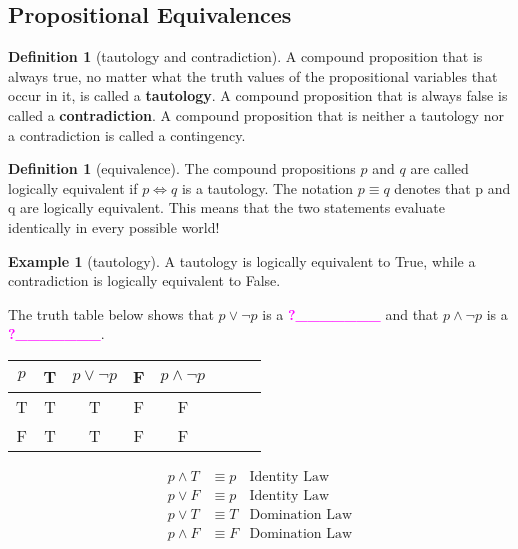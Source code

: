 \documentclass[letterpaper,10pt]{article}
\theoremstyle{plain}
\theoremstyle{definition}
\newtheorem{defn}[thm]{Definition}
\newtheorem{exmp}[thm]{Example}
\theoremstyle{remark}
\providecommand{\land}{\ensuremath{\wedge}}
\providecommand{\lor}{\ensuremath{\vee}}
\providecommand{\todo}[1]{\textcolor{magenta}{\textbf{#1}}}
\begin{document}
\subsection{Propositional Equivalences}

\begin{defn}[tautology and contradiction]

A compound proposition that is always true, no matter what the truth values of the propositional
variables that occur in it, is called a \textbf{tautology}. A compound proposition that is always
false is called a \textbf{contradiction}. A compound proposition that is neither a tautology nor a
contradiction is called a contingency.

\end{defn}
\begin{defn}[equivalence]
The compound propositions $p$ and $q$ are called logically equivalent if $p \iff q$ is a tautology.
The notation $p \equiv q$ denotes that p and q are logically equivalent. This means that the two statements evaluate identically in every possible world!
\end{defn}
\begin{exmp}[tautology]
A tautology is logically equivalent to True, while a contradiction is logically equivalent to False.

The truth table below shows that $p \lor \lnot p$ is a \todo{?\_\_\_\_\_\_\_} and that $p \land \lnot p$ is a \todo{?\_\_\_\_\_\_\_}.
\begin{center} 
\begin{tabular}{ | c | c | c |c |c |c |c |c |} 
  \hline
 $p$ & T & $ p \lor \lnot p$&F & $p \land \lnot p$\\
 \hline
  T &T  &T&F&F\\ 
  F & T & T&F&F\\ 
  \hline
\end{tabular}


\begin{align}
p \land T &\equiv p  & \text{Identity Law}\\
p \lor F &\equiv p  & \text{Identity Law}\\
p \lor T & \equiv T & \text{Domination Law}\\
p \land F & \equiv F & \text{Domination Law}
\end{align}
\end{center}
\end{exmp}
\end{document}
